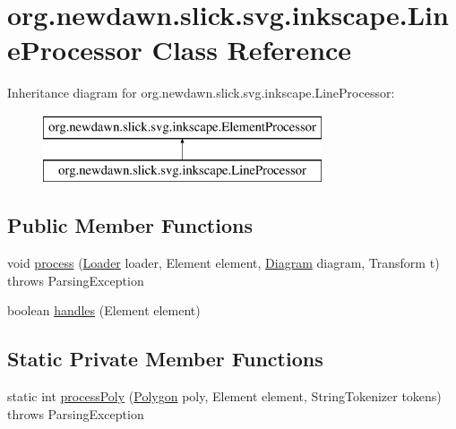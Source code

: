\hypertarget{classorg_1_1newdawn_1_1slick_1_1svg_1_1inkscape_1_1_line_processor}{}\section{org.\+newdawn.\+slick.\+svg.\+inkscape.\+Line\+Processor Class Reference}
\label{classorg_1_1newdawn_1_1slick_1_1svg_1_1inkscape_1_1_line_processor}
Inheritance diagram for org.\+newdawn.\+slick.\+svg.\+inkscape.\+Line\+Processor\+:\begin{figure}[H]
\begin{center}
\leavevmode
\includegraphics[height=2.000000cm]{classorg_1_1newdawn_1_1slick_1_1svg_1_1inkscape_1_1_line_processor}
\end{center}
\end{figure}
\subsection*{Public Member Functions}
\begin{DoxyCompactItemize}
\item 
void \mbox{\hyperlink{classorg_1_1newdawn_1_1slick_1_1svg_1_1inkscape_1_1_line_processor_a709d0be1a74b032aa4646f3a51a52657}{process}} (\mbox{\hyperlink{interfaceorg_1_1newdawn_1_1slick_1_1svg_1_1_loader}{Loader}} loader, Element element, \mbox{\hyperlink{classorg_1_1newdawn_1_1slick_1_1svg_1_1_diagram}{Diagram}} diagram, Transform t)  throws Parsing\+Exception 
\item 
boolean \mbox{\hyperlink{classorg_1_1newdawn_1_1slick_1_1svg_1_1inkscape_1_1_line_processor_ae2f55b553c23eb5a3bab9d194ce2b4bb}{handles}} (Element element)
\end{DoxyCompactItemize}
\subsection*{Static Private Member Functions}
\begin{DoxyCompactItemize}
\item 
static int \mbox{\hyperlink{classorg_1_1newdawn_1_1slick_1_1svg_1_1inkscape_1_1_line_processor_aa3e9696d420d187f0921356b4075458a}{process\+Poly}} (\mbox{\hyperlink{classorg_1_1newdawn_1_1slick_1_1geom_1_1_polygon}{Polygon}} poly, Element element, String\+Tokenizer tokens)  throws Parsing\+Exception 
\end{DoxyCompactItemize}


